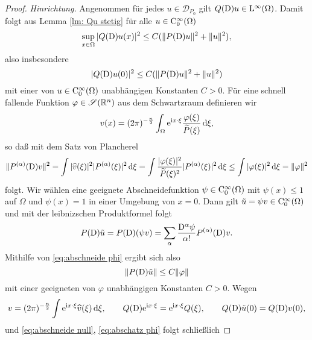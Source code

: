 \begin{proof}{\it Hinrichtung.}
Angenommen für jedes $u \in \mathcal{D}_{P_0}$ gilt $Q(\mathrm D)u\in\mathrm L^\infty(\Omega)$. 
Damit folgt aus Lemma \ref{lm: Qu stetig}  für alle $u \in \mathrm C_0^{\infty}(\Omega)$
\begin{equation}
\sup_{x \in \Omega} | Q(\mathrm D)u(x)|^2 \leq C ( \Vert  P(\mathrm D)u\Vert^2 + \Vert u\Vert^2 ),
\end{equation}
also insbesondere
\begin{equation}\label{eq:abschneide null}
|Q(\mathrm D)u(0)|^2 \leq C( \Vert  P(\mathrm D)u\Vert^2 + \Vert u\Vert^2 ) 
\end{equation}
mit einer von $u\in\mathrm C_0^\infty(\Omega)$ unabhängigen Konstanten $C>0$. Für eine schnell fallende Funktion $ \varphi \in \mathscr S(\mathbb R^n)$ aus dem Schwartzraum definieren wir
\begin{equation}
v(x)= (2 \pi)^{-\frac{n}{2}} \int_{\Omega}\mathrm e^{\mathrm i x \cdot \xi} \frac{\varphi (\xi)}{\widetilde{P}(\xi)} \,\mathrm d \xi,
\end{equation}
so daß mit dem Satz von Plancherel
\begin{equation}\label{eq:abschneide phi}
\Vert P^{(\alpha)}(\mathrm D)v \Vert^2 = \int |\widehat{v}(\xi)|^2 |P^{(\alpha)}(\xi)|^2 \,\mathrm d \xi = \int \frac{|\varphi(\xi)|^2}{\widetilde{P}(\xi)^2} | P^{(\alpha)} (\xi)|^2 \,\mathrm d \xi \leq \int |\varphi(\xi)|^2 \,\mathrm d \xi= \Vert \varphi \Vert^2
\end{equation}
folgt.
Wir wählen eine geeignete Abschneidefunktion $\psi \in \mathrm C_0^{\infty}(\Omega)$ mit $\psi(x) \leq 1$ auf $\Omega$ und $\psi(x)=1$ in einer Umgebung von $x=0$. Dann gilt $\tilde{u} = \psi v \in \mathrm C_0^{\infty}(\Omega)$ und mit der leibnizschen Produktformel folgt
\begin{equation}
P(\mathrm D)\tilde{u} = P(\mathrm D)(\psi v) = \sum_{\alpha} \frac{\mathrm D^{\alpha} \psi}{\alpha !} P^{(\alpha)}(\mathrm D) v.
\end{equation}
Mithilfe von \eqref{eq:abschneide phi} ergibt sich also
\begin{equation}\label{eq:abschatz phi}
\Vert P(\mathrm D) \tilde{u} \Vert \leq C \Vert \varphi \Vert
\end{equation}
mit einer geeigneten von $\varphi$ unabhängigen Konstanten $C>0$.
Wegen
\begin{equation}
v = (2 \pi)^{-\frac{n}{2}} \int \mathrm e^{\mathrm i x \cdot \xi} \widehat{v}(\xi) \,\mathrm d \xi, \qquad Q(\mathrm D)\mathrm e^{\mathrm i x \cdot \xi} = \mathrm e^{\mathrm i x \cdot \xi} Q(\xi), \qquad Q(\mathrm D)\tilde{u}(0) = Q(\mathrm D)v(0),
\end{equation}
und \eqref{eq:abschneide null}, \eqref{eq:abschatz phi} folgt schließlich

\end{proof}
